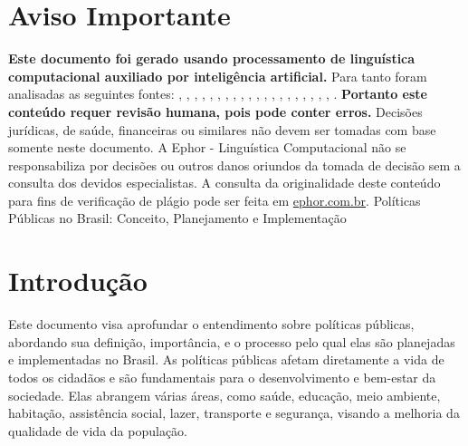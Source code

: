 \documentclass[
   article,       
   12pt,          
   oneside,       
   a4paper,       
   english,       
   brazil,        
   sumario=tradicional
   ]{abntex2}
\begin{document}
\frenchspacing 
\maketitle

\textual
\section{Aviso Importante}
\textbf{Este documento foi gerado usando processamento de linguística computacional auxiliado por inteligência artificial.} Para tanto foram analisadas as seguintes fontes:  \cite{A_CAUSA_E_AS_POLITICAS_DE_DIREITOS_HUMANOS_NO}, \cite{Ciclo_de_Politicas_Publicas_por_que_e_importa}, \cite{Conheca_o_ciclo_das_politicas_publicas__Polit}, \cite{Educacao_Inclusiva_Conheca_o_historico_da_leg}, \cite{Entendendo_a_Tipologia_de_Politicas_Publicas_}, \cite{Escola_Nacional_de_Administracao_Publica__Wik}, \cite{Especialista_em_politicas_publicas_e_gestao_g}, \cite{FEDERALISMO_E_POLITICAS_PUBLICAS_NO_BRASIL_Ho}, \cite{Ministerio_do_Planejamento_e_Orcamento__Wikip}, \cite{Ministro_defende_que_direitos_humanos_precisa}, \cite{Politica_conceito_politicas_publicas_e_partid}, \cite{Politica_publica__o_que_e_tipos_de_politicas_}, \cite{Politica_publica__Wikipedia_a_enciclopedia_li}, \cite{Politicas_publicas__Wikipedia_la_enciclopedia}, \cite{Politicas_Publicas_entenda_o_que_sao_para_que}, \cite{Politicas_Publicas_o_que_sao_e_para_que_serve}, \cite{Politicas_publicas_o_que_sao_e_para_que_serve}, \cite{Politicas_publicas_o_que_sao_quem_faz_e_tipos}, \cite{Politicas_publicas_o_que_sao_tipos_e_exemplos}, \cite{Revista_USP_119__Dossie_1_Democracia_e_politi}, \cite{TCU_Ciclo_das_politicas_publicas__Tudo_o_que_}.
\textbf{Portanto este conteúdo requer revisão humana, pois pode conter erros.} Decisões jurídicas, de saúde, financeiras ou similares não devem ser tomadas com base somente neste documento. A Ephor - Linguística Computacional não se responsabiliza por decisões ou outros danos oriundos da tomada de decisão sem a consulta dos devidos especialistas.
A consulta da originalidade deste conteúdo para fins de verificação de plágio pode ser feita em \href{http://www.ephor.com.br}{ephor.com.br}.
Políticas Públicas no Brasil: Conceito, Planejamento e Implementação

\section{Introdução}
Este documento visa aprofundar o entendimento sobre políticas públicas, abordando sua definição, importância, e o processo pelo qual elas são planejadas e implementadas no Brasil. As políticas públicas afetam diretamente a vida de todos os cidadãos e são fundamentais para o desenvolvimento e bem-estar da sociedade. Elas abrangem várias áreas, como saúde, educação, meio ambiente, habitação, assistência social, lazer, transporte e segurança, visando a melhoria da qualidade de vida da população.
\end{document}
